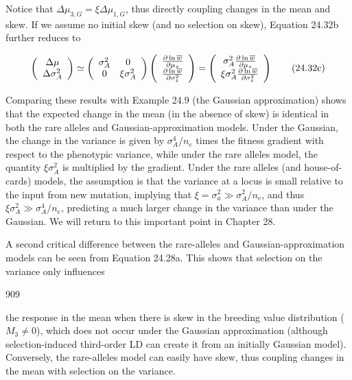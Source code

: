 \documentclass{article}
\begin{document}
Notice that  $ \Delta\mu_{3,G} = \xi\Delta\mu_{1,G} $, thus directly coupling changes in the mean and skew. If we assume no initial skew (and no selection on skew), Equation 24.32b further reduces to

\begin{equation}
\left(\begin{array}{c}{{{\Delta\mu}}} \\{{{\Delta\sigma_{A}^{2}}}}\end{array}\right)\simeq\left(\begin{array}{c c}{{{\sigma_{A}^{2}}}}&{{{0}}} \\{{{0}}}&{{{\xi\sigma_{A}^{2}}}}\end{array}\right)\left(\begin{array}{c}{{{\frac{\partial\ln\overline{w}}{\partial\mu_{z}}}}} \\{{{\frac{\partial\ln\overline{w}}{\partial\sigma_{z}^{2}}}}}\end{array}\right)=\left(\begin{array}{c}{{{\sigma_{A}^{2}\frac{\partial\ln\overline{w}}{\partial\mu_{z}}}}} \\{{{\xi\sigma_{A}^{2}\frac{\partial\ln\overline{w}}{\partial\sigma_{z}^{2}}}}}\end{array}\right)
\tag{24.32c}
\label{eq:24_32c}
\end{equation}

Comparing these results with Example 24.9 (the Gaussian approximation) shows that the expected change in the mean (in the absence of skew) is identical in both the rare alleles and Gaussian-approximation models. Under the Gaussian, the change in the variance is given by  $ \sigma_A^4 / n_e $ times the fitness gradient with respect to the phenotypic variance, while under the rare alleles model, the quantity  $ \xi \sigma_A^2 $ is multiplied by the gradient. Under the rare alleles (and house-of-cards) models, the assumption is that the variance at a locus is small relative to the input from new mutation, implying that  $ \xi = \sigma_a^2 \gg \sigma_A^2 / n_e $, and thus  $ \xi \sigma_A^2 \gg \sigma_A^4 / n_e $, predicting a much larger change in the variance than under the Gaussian. We will return to this important point in Chapter 28.

A second critical difference between the rare-alleles and Gaussian-approximation models can be seen from Equation 24.28a. This shows that selection on the variance only influences

909

the response in the mean when there is skew in the breeding value distribution ( $ M_3 \neq 0 $), which does not occur under the Gaussian approximation (although selection-induced third-order LD can create it from an initially Gaussian model). Conversely, the rare-alleles model can easily have skew, thus coupling changes in the mean with selection on the variance.
\end{document}
